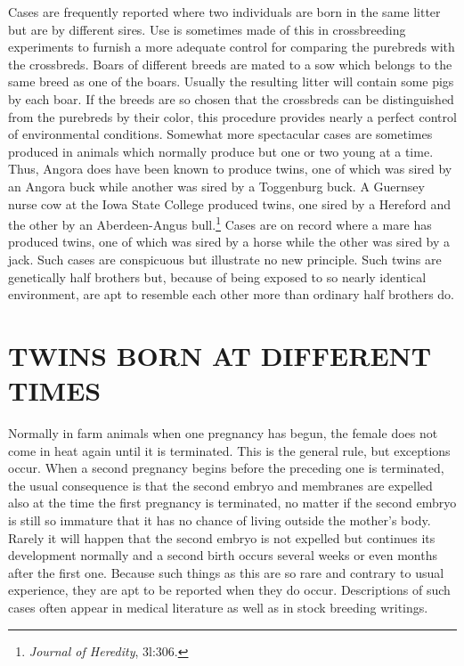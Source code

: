 Cases are frequently reported where two individuals are born in the
same litter but are by different sires. Use is sometimes made of this in
crossbreeding experiments to furnish a more adequate control for comparing
the purebreds with the crossbreds. Boars of different breeds are
mated to a sow which belongs to the same breed as one of the boars.
Usually the resulting litter will contain some pigs by each boar. If the
breeds are so chosen that the crossbreds can be distinguished from the
purebreds by their color, this procedure provides nearly a perfect control
of environmental conditions. Somewhat more spectacular cases are
sometimes produced in animals which normally produce but one or
two young at a time. Thus, Angora does have been known to produce
twins, one of which was sired by an Angora buck while another was
sired by a Toggenburg buck. A Guernsey nurse cow at the Iowa State
College produced twins, one sired by a Hereford and the other by an
Aberdeen-Angus bull.\footnote{\textit{Journal of Heredity}, 3l:306.}
Cases are on record where a mare has produced
twins, one of which was sired by a horse while the other was sired by a
jack. Such cases are conspicuous but illustrate no new principle. Such
twins are genetically half brothers but, because of being exposed to
so nearly identical environment, are apt to resemble each other more
than ordinary half brothers do.

\section*{TWINS BORN AT DIFFERENT TIMES}

Normally in farm animals when one pregnancy has begun, the
female does not come in heat again until it is terminated. This is the
general rule, but exceptions occur. When a second pregnancy begins
before the preceding one is terminated, the usual consequence is that
the second embryo and membranes are expelled also at the time the first
pregnancy is terminated, no matter if the second embryo is still so
immature that it has no chance of living outside the mother's body.
Rarely it will happen that the second embryo is not expelled but continues
its development normally and a second birth occurs several weeks
or even months after the first one. Because such things as this are so
rare and contrary to usual experience, they are apt to be reported when
they do occur. Descriptions of such cases often appear in medical literature
as well as in stock breeding writings.

